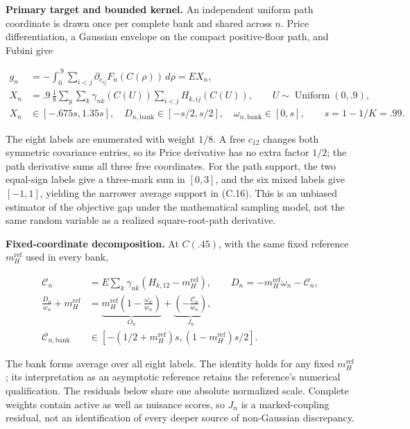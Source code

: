 \documentclass{article}
\begin{document}
\textbf{Primary target and bounded kernel.} An independent uniform path
coordinate is drawn once per complete bank and shared across \(n\).
Price differentiation, a Gaussian envelope on the compact positive-floor
path, and Fubini give

\[
\begin{aligned}
g_n&=-\int_0^{.9}\sum_{i<j}\partial_{c_{ij}}F_n(C(\rho))\,d\rho=EX_n,\\
X_n&=.9\,\frac18\sum_y\sum_k\gamma_{nk}(C(U))\sum_{i<j}H_{k,ij}(C(U)),
\qquad U\sim\operatorname{Uniform}(0,.9),\\
X_n&\in[-.675s,1.35s],\quad D_{n,\mathrm{bank}}\in[-s/2,s/2],\quad
\omega_{n,\mathrm{bank}}\in[0,s],\qquad s=1-1/K=.99.
\end{aligned}
\tag{C.16}
\]

The eight labels are enumerated with weight \(1/8\). A free \(c_{12}\)
changes both symmetric covariance entries, so its Price derivative has
no extra factor \(1/2\); the path derivative sums all three free
coordinates. For the path support, the two equal-sign labels give a
three-mark sum in \([0,3]\), and the six mixed labels give \([-1,1]\),
yielding the narrower average support in (C.16). This is an unbiased
estimator of the objective gap under the mathematical sampling model,
not the same random variable as a realized square-root-path derivative.

\textbf{Fixed-coordinate decomposition.} At \(C(.45)\), with the same
fixed reference \(m_H^{\mathrm{ref}}\) used in every bank,

\[
\begin{aligned}
\mathcal C_n&=E\sum_k\gamma_{nk}(H_{k,12}-m_H^{\mathrm{ref}}),\qquad D_n=-m_H^{\mathrm{ref}}\omega_n-\mathcal C_n,\\
\frac{D_n}{w_n}+m_H^{\mathrm{ref}}&=\underbrace{m_H^{\mathrm{ref}}\left(1-\frac{\omega_n}{w_n}\right)}_{O_n}
+\underbrace{\left(-\frac{\mathcal C_n}{w_n}\right)}_{J_n},\\
\mathcal C_{n,\mathrm{bank}}&\in[-(1/2+m_H^{\mathrm{ref}})s,(1-m_H^{\mathrm{ref}})s/2].
\end{aligned}
\tag{C.17}
\]

The bank forms average over all eight labels. The identity holds for any
fixed \(m_H^{\mathrm{ref}}\); its interpretation as an asymptotic
reference retains the reference's numerical qualification. The residuals
below share one absolute normalized scale. Complete weights contain
active as well as nuisance scores, so \(J_n\) is a marked-coupling
residual, not an identification of every deeper source of non-Gaussian
discrepancy.
\end{document}
